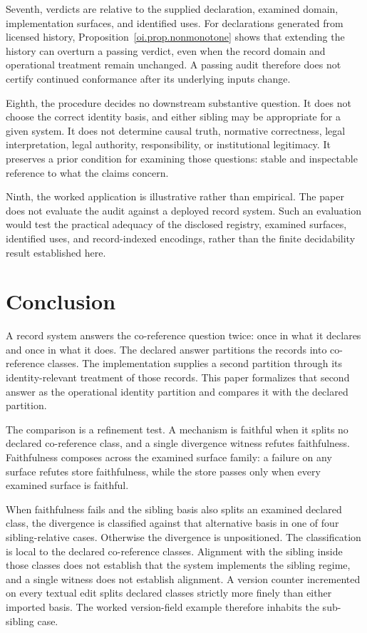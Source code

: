 \documentclass[11pt]{article}
\theoremstyle{plain}
\theoremstyle{definition}
\theoremstyle{remark}
\begin{document}
Seventh, verdicts are relative to the supplied declaration,
examined domain, implementation surfaces, and identified uses.
For declarations generated from licensed history,
Proposition~\ref{oi.prop.nonmonotone} shows
that extending the history can overturn a passing verdict,
even when the record domain and operational treatment remain unchanged.
A passing audit therefore does not certify continued
conformance after its underlying inputs change.

Eighth, the procedure decides no downstream substantive question.
It does not choose the correct identity basis,
and either sibling may be appropriate for a given system.
It does not determine causal truth,
normative correctness,
legal interpretation,
legal authority,
responsibility,
or institutional legitimacy.
It preserves a prior condition for examining those questions:
stable and inspectable reference to what the claims concern.

Ninth, the worked application is illustrative rather than empirical.
The paper does not evaluate the audit against a deployed record system.
Such an evaluation would test the practical adequacy of the disclosed registry,
examined surfaces, identified uses, and record-indexed encodings,
rather than the finite decidability result established here.

\section{Conclusion}
\label{oi.sec.conclusion}

A record system answers the co-reference question twice:
once in what it declares
and once in what it does.
The declared answer partitions the records into co-reference classes.
The implementation supplies a second partition through its identity-relevant treatment of those records.
This paper formalizes that second answer as the operational identity partition
and compares it with the declared partition.

The comparison is a refinement test.
A mechanism is faithful when it splits no declared co-reference class,
and a single divergence witness refutes faithfulness.
Faithfulness composes across the examined surface family:
a failure on any surface refutes store faithfulness,
while the store passes only when every examined surface is faithful.

When faithfulness fails and the sibling basis also splits an examined declared class,
the divergence is classified against that alternative basis
in one of four sibling-relative cases.
Otherwise the divergence is unpositioned.
The classification is local to the declared co-reference classes.
Alignment with the sibling inside those classes
does not establish that the system implements the sibling regime,
and a single witness does not establish alignment.
A version counter incremented on every textual edit
splits declared classes strictly more finely than either imported basis.
The worked version-field example therefore inhabits the sub-sibling case.
\end{document}
